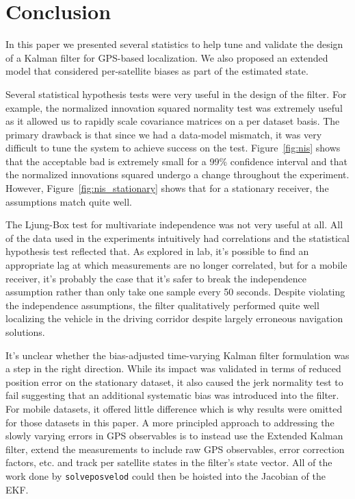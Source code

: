 \section{Conclusion}\label{sec:conclusion}
In this paper we presented several statistics to help tune and validate the design of a Kalman filter for GPS-based localization.  We also proposed an extended model that considered per-satellite biases as part of the estimated state.

Several statistical hypothesis tests were very useful in the design of the filter.  For example, the normalized innovation squared normality test was extremely useful as it allowed us to rapidly scale covariance matrices on a per dataset basis.  The primary drawback is that since we had a data-model mismatch, it was very difficult to tune the system to achieve success on the test.  Figure~\ref{fig:nis} shows that the acceptable bad is extremely small for a 99\% confidence interval and that the normalized innovations squared undergo a change throughout the experiment.  However, Figure~\ref{fig:nis_stationary} shows that for a stationary receiver, the assumptions match quite well.

The Ljung-Box test for multivariate independence was not very useful at all.  All of the data used in the experiments intuitively had correlations and the statistical hypothesis test reflected that.  As explored in lab, it's possible to find an appropriate lag at which measurements are no longer correlated, but for a mobile receiver, it's probably the case that it's safer to break the independence assumption rather than only take one sample every 50 seconds.  Despite violating the independence assumptions, the filter qualitatively performed quite well localizing the vehicle in the driving corridor despite largely erroneous navigation solutions.

It's unclear whether the bias-adjusted time-varying Kalman filter formulation was a step in the right direction.  While its impact was validated in terms of reduced position error on the stationary dataset, it also caused the jerk normality test to fail suggesting that an additional systematic bias was introduced into the filter.  For mobile datasets, it offered little difference which is why results were omitted for those datasets in this paper.  A more principled approach to addressing the slowly varying errors in GPS observables is to instead use the Extended Kalman filter, extend the measurements to include raw GPS observables, error correction factors, etc. and track per satellite states in the filter's state vector.  All of the work done by \texttt{solveposvelod} could then be hoisted into the Jacobian of the EKF.
